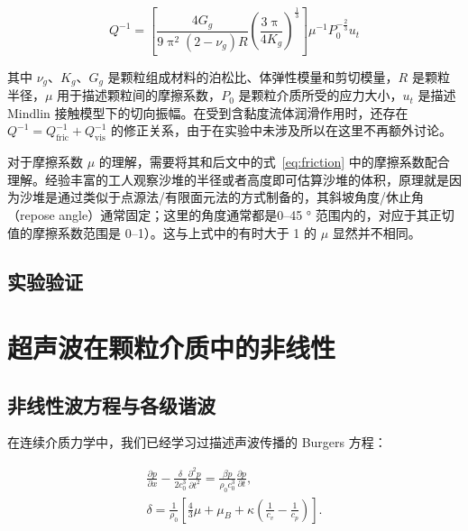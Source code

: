 \begin{equation}
  Q^{-1} = \left[\frac{4G_{g}}{9\uppi^2(2-\nu_{g})R}\left(\frac{3\uppi}{4K_{g}}\right)^{\frac{1}{3}}\right]\mu^{-1}P_{0}^{-\frac{2}{3}}u_{t}
\end{equation}

其中 $\nu_{g}$、$K_{g}$、$G_{g}$ 是颗粒组成材料的泊松比、体弹性模量和剪切模量，$R$ 是颗粒半径，$\mu$ 用于描述颗粒间的摩擦系数，$P_{0}$ 是颗粒介质所受的应力大小，$u_{t}$ 是描述 Mindlin 接触模型下的切向振幅。在受到含黏度流体润滑作用时，还存在 $Q^{-1} = Q_{\text{fric}}^{-1} + Q_{\text{vis}}^{-1}$ 的修正关系，由于在实验中未涉及所以在这里不再额外讨论。

对于摩擦系数 $\mu$ 的理解，需要将其和后文中的式~\eqref{eq:friction} 中的摩擦系数配合理解。经验丰富的工人观察沙堆的半径或者高度即可估算沙堆的体积，原理就是因为沙堆是通过类似于点源法/有限面元法的方式制备的，其斜坡角度/休止角（repose angle）通常固定；这里的角度通常都是\numrange{0}{45} \unit{\degree} 范围内的，对应于其正切值的摩擦系数范围是 \numrange{0}{1}）。这与上式中的有时大于 1 的 $\mu$ 显然并不相同。

\subsection{实验验证}



\section{超声波在颗粒介质中的非线性}


\subsection{非线性波方程与各级谐波}

在连续介质力学中，我们已经学习过描述声波传播的 Burgers 方程：

\begin{align}
  \frac{\partial p}{\partial x} - \frac{\delta}{2c_{0}^{3}}\frac{\partial^{2}p}{\partial t^{2}} = \frac{\beta p}{\rho_{0}c_{0}^{3}}\frac{\partial p}{\partial t},\label{eq:burgers_equation_1}\\
  \delta = \frac{1}{\rho_{0}}\left[\frac{4}{3}\mu + \mu_{B} + \kappa\left(\frac{1}{c_{v}} - \frac{1}{c_{p}}\right)\right].
\end{align}

